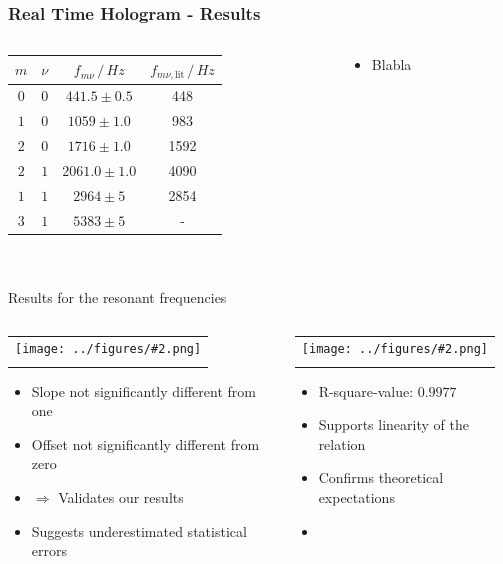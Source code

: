 \documentclass[10pt]{beamer}
\newcommand{\gra}[3][]{
	\begin{table}
	\centering
	\begin{tabular}[width=\textwidth]{c}
		\texttt{[image: ../figures/\#2.png]}\\
		\small #3
	\end{tabular}
	\end{table}
}
\begin{document}
\begin{frame}
	\frametitle{Real Time Hologram - Results}
	\begin{columns}
		\begin{column}{0.6\textwidth}
			\begin{table}
				\centering
				\begin{tabular}{c|c|c|c}
					$m$ & $\nu$ 		& $f_{m\nu}\,/\,\si{Hz}$ 	& $f_{m\nu, \text{lit}}\,/\,\si{Hz}$\\ \hline\hline
					$0$&$0$	& $441.5\pm0.5$					& 448	\\ \hline
					$1$&$0$	& $1059\pm1.0$				& 983	\\ \hline
					$2$&$0$	& $1716\pm1.0$				& 1592	\\ \hline
					$2$&$1$	& $2061.0\pm1.0$				& 4090	\\ \hline
					$1$&$1$	& $2964\pm5$				& 2854 \\ \hline
					$3$&$1$	& $5383\pm5$				&-
				\end{tabular}\\\scriptsize\ \\\small
				{Results for the resonant frequencies\footnotemark}
			\end{table}		
		\end{column}
		\pause
		\begin{column}{0.5\textwidth}
			\begin{itemize}
				\item Blabla
			\end{itemize}
		\end{column}
	\end{columns}
	\footnotetext{\fullcite{staats}}
\end{frame}

\begin{frame}
	\begin{columns}
	\begin{column}{0.5\textwidth}
		\gra{LinFitResFreq}{}
	\begin{itemize}
		\item Slope not significantly different from one
		\item Offset not significantly different from zero
		\item[]$\Rightarrow$ Validates our results
		\item Suggests underestimated statistical errors
	\end{itemize}
	\end{column}
	\begin{column}{0.5\textwidth}
		\gra{LinFitResFreq1}{}
	\begin{itemize}
		\item R-square-value: $0.9977$
		\item Supports linearity of the relation
		\item Confirms theoretical expectations
		\item[] \ 
	\end{itemize}
	\end{column}
	\end{columns}
\end{frame}
\end{document}
